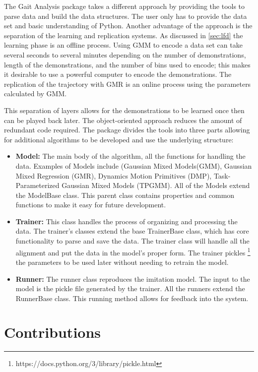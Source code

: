The Gait Analysis package takes a different approach by providing the tools to parse data and build the data structures. The user only has to provide the data set and basic understanding of Python. Another advantage of the approach is the separation of the learning and replication systems. As discussed in \autoref{sec:lfd} the learning phase is an offline process. Using GMM to encode a data set can take several seconds to several minutes depending on the number of demonstrations, length of the demonstrations, and the number of bins used to encode; this makes it desirable to use a powerful computer to encode the demonstrations. The replication of the trajectory with GMR is an online process using the parameters calculated by GMM. 

This separation of layers allows for the demonstrations to be learned once then can be played back later. The object-oriented approach reduces the amount of redundant code required. The package divides the tools into three parts allowing for additional algorithms to be developed and use the underlying structure: 

\begin{itemize}[noitemsep]
    \item \textbf{Model:} The main body of the algorithm, all the functions for handling the data. Examples of Models include (Gaussian Mixed Models(GMM), Gaussian Mixed Regression (GMR), Dynamics Motion Primitives (DMP), Task-Parameterized Gaussian Mixed Models (TPGMM). All of the Models extend the ModelBase class. This parent class contains properties and common functions to make it easy for future development.
    \item \textbf{Trainer:} This class handles the process of organizing and processing the data. The trainer's classes extend the base TrainerBase class, which has core functionality to parse and save the data. The trainer class will handle all the alignment and put the data in the model's proper form. The trainer pickles \footnote{https://docs.python.org/3/library/pickle.html} the parameters to be used later without needing to retrain the model. 
    \item \textbf{Runner:} The runner class reproduces the imitation model. The input to the model is the pickle file generated by the trainer. All the runners extend the RunnerBase class. This running method allows for feedback into the system. 
\end{itemize}


\section{Contributions}

